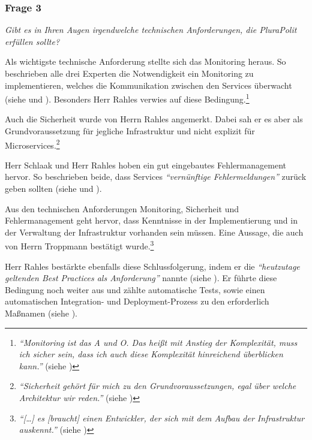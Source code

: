 \subsubsection{Frage 3}
\label{sec:frage3}

\textit{Gibt es in Ihren Augen irgendwelche technischen Anforderungen, die PluraPolit erfüllen sollte?}

Als wichtigste technische Anforderung stellte sich das Monitoring heraus. So beschrieben alle drei Experten die Notwendigkeit ein Monitoring zu implementieren, welches die Kommunikation zwischen den Services überwacht (siehe  und ). Besonders Herr Rahles verwies auf diese Bedingung.\footnote{
\textit{\enquote{Monitoring ist das A und O. Das heißt mit Anstieg der Komplexität, muss ich sicher sein, dass ich auch diese Komplexität hinreichend überblicken kann.}} (siehe )
}

Auch die Sicherheit wurde von Herrn Rahles angemerkt. Dabei sah er es aber als Grundvoraussetzung für jegliche Infrastruktur und nicht explizit für Microservices.\footnote{
\textit{\enquote{Sicherheit gehört für mich zu den Grundvoraussetzungen, egal über welche Architektur wir reden.}} (siehe )
}

Herr Schlaak und Herr Rahles hoben ein gut eingebautes Fehlermanagement hervor. So beschrieben beide, dass Services \textit{\enquote{vernünftige Fehlermeldungen}} zurück geben sollten (siehe  und ).

Aus den technischen Anforderungen Monitoring, Sicherheit und Fehlermanagement geht hervor, dass Kenntnisse in der Implementierung und in der Verwaltung der Infrastruktur vorhanden sein müssen. Eine Aussage, die auch von Herrn Troppmann bestätigt wurde.\footnote{
\textit{\enquote{[…] es [braucht] einen Entwickler, der sich mit dem Aufbau der Infrastruktur auskennt.}} (siehe )
}

Herr Rahles bestärkte ebenfalls diese Schlussfolgerung, indem er die \textit{\enquote{heutzutage geltenden Best Practices als Anforderung}} nannte (siehe ). Er führte diese Bedingung noch weiter aus und zählte automatische Tests, sowie einen automatischen Integration- und Deployment-Prozess zu den erforderlich Maßnamen (siehe ).
